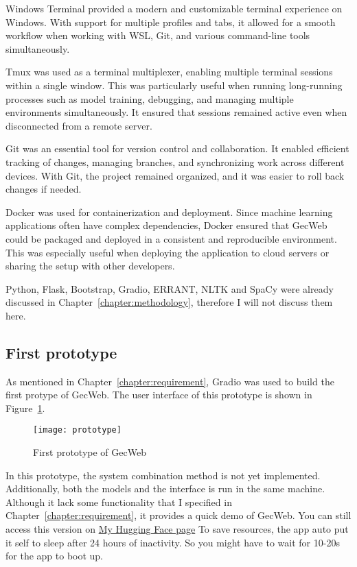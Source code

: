 Windows Terminal provided a modern and customizable terminal experience on Windows.
With support for multiple profiles and tabs, it allowed for a smooth workflow when working with WSL, Git, and various command-line tools simultaneously.

Tmux was used as a terminal multiplexer, enabling multiple terminal sessions within a single window.
This was particularly useful when running long-running processes such as model training, debugging, and managing multiple environments simultaneously.
It ensured that sessions remained active even when disconnected from a remote server.

Git was an essential tool for version control and collaboration.
It enabled efficient tracking of changes, managing branches, and synchronizing work across different devices.
With Git, the project remained organized, and it was easier to roll back changes if needed.

Docker was used for containerization and deployment.
Since machine learning applications often have complex dependencies, Docker ensured that GecWeb could be packaged and deployed in a consistent and reproducible environment.
This was especially useful when deploying the application to cloud servers or sharing the setup with other developers.

Python, Flask, Bootstrap, Gradio, ERRANT, NLTK and SpaCy were already discussed in Chapter~\ref{chapter:methodology}, therefore I will not discuss them here.

\subsection{First prototype}

As mentioned in Chapter~\ref{chapter:requirement}, Gradio was used to build the first protype of GecWeb.
The user interface of this prototype is shown in Figure~\ref{fig:prototype}.

\begin{figure}[htbp]
  \begin{center}
    \texttt{[image: prototype]}
  \end{center}
  \caption{First prototype of GecWeb}\label{fig:prototype}
\end{figure}

In this prototype, the system combination method is not yet implemented.
Additionally, both the models and the interface is run in the same machine.
Although it lack some functionality that I specified in Chapter~\ref{chapter:requirement}, it provides a quick demo of GecWeb.
You can still access this version on \href{https://huggingface.co/spaces/canh25xp/gector_demo}{My Hugging Face page}
To save resources, the app auto put it self to sleep after 24 hours of inactivity.
So you might have to wait for 10-20s for the app to boot up.

